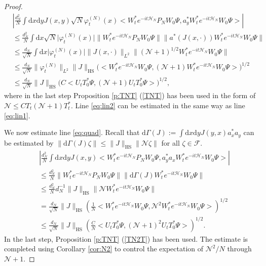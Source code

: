\documentclass[11pt,a4paper,draft,DIV11]{scrartcl}	%
\newcommand{\fock}{\mathcal{F}}		%
\newcommand{\di}{\textrm{d}}		%
\newcommand{\Ncal}{\mathcal{N}}		%
\newcommand{\Hcal}{\mathcal{H}}		%
\newcommand{\scal}[2]{\big<#1,#2\big>} %
\newcommand{\norm}[1]{\lVert#1\rVert}	%
\newcommand{\ph}{\varphi_t^{(N)}}	%
\begin{document}
\begin{proof}
\begin{align*}
& \left\lvert \frac{d_N^2}{N} \int \di x\di y J(x,y) \sqrt{N} \ph(x) \scal{W^\ast_t e^{-it\Hcal_N} P_N W_0 \Psi}{a^\ast_y W^\ast_t e^{-it \Hcal_N} W_0 \Psi} \right\rvert \\
& \leq \frac{d_N^2}{N} \int \di x \sqrt{N} \lvert \ph(x)\rvert \norm{W^\ast_t e^{-it \Hcal_N} P_N W_0 \Psi} \norm{ a^\ast(J(x,\cdot))W^\ast_t e^{-it \Hcal_N} W_0 \Psi} \\
& \leq \frac{d_N}{\sqrt{N}} \int \di x \lvert \ph(x)\rvert \norm{J(x,\cdot)}_{L^2} \norm{(\Ncal+1)^{1/2}W^\ast_t e^{-it\Hcal_N}W_0 \Psi} \\
& \leq \frac{d_N}{\sqrt{N}} \norm{\ph}_{L^2} \norm{J}_{\textrm{HS}} \Big( \scal{W^\ast_t e^{-it \Hcal_N}W_0 \Psi}{(\Ncal+1)W^\ast_t e^{-it\Hcal_N} W_0 \Psi} \Big)^{1/2} \\
& \leq \frac{d_N}{\sqrt{N}} \norm{J}_{\textrm{HS}} \Big(C \scal{U_t T^\ast_0 \Psi}{(\Ncal+1)U_t T^\ast_0 \Psi} \Big)^{1/2},
\end{align*}
where in the last step Proposition \ref{p:TNT} (\ref{TNT}) has been used in the form of $\Ncal \leq C T_t (\Ncal+1)T^\ast_t$.
Line \eqref{eq:lin2} can be estimated in the same way as line \eqref{eq:lin1}.

We now estimate line \eqref{eq:quad}. Recall that $\di\Gamma(J) := \int \di x\di y J(y,x) a^\ast_x a_y$ can be estimated by $\norm{\di\Gamma(J)\zeta} \leq \norm{J}_{\textrm{HS}} \norm{\Ncal \zeta}$ for all $\zeta \in \fock$.
\begin{align*}
& \left\lvert \frac{d_N^2}{N} \int \di x\di y J(x,y) \scal{W^\ast_t e^{-it\Hcal_N} P_N W_0 \Psi}{a^\ast_y a_x W^\ast_t e^{-it \Hcal_N}W_0 \Psi} \right\rvert \\
& \leq \frac{d_N^2}{N} \norm{W^\ast_t e^{-it\Hcal_N}P_N W_0 \Psi} \norm{\di\Gamma(J)W^\ast_t e^{-it \Hcal_N}W_0 \Psi} \\
& \leq \frac{d_N^2}{N} d_N^{-1} \norm{J}_{\textrm{HS}} \norm{\Ncal W^\ast_t e^{-it\Hcal_N}W_0 \Psi} \\
& = \frac{d_N}{\sqrt{N}} \norm{J}_{\textrm{HS}} \left( \frac{1}{N} \scal{W^\ast_t e^{-it\Hcal_N}W_0 \Psi}{\Ncal^2 W^\ast_t e^{-it\Hcal_N}W_0 \Psi} \right)^{1/2} \\
& \leq \frac{d_N}{\sqrt{N}} \norm{J}_{\textrm{HS}} \left( \frac{C}{N} \scal{U_t T^\ast_0 \Psi}{(\Ncal+1)^2 U_t T^\ast_0 \Psi} \right)^{1/2}.
\end{align*}
In the last step, Proposition \ref{p:TNT} (\ref{TN2T}) has been used. The estimate is completed using Corollary \ref{cor:N2} to control the expectation of $\Ncal^2/N$ through $\Ncal+1$.
\end{proof}
\end{document}
